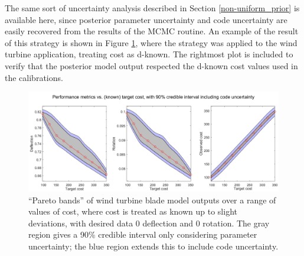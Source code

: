 \documentclass{article}
\begin{document}
The same sort of uncertainty analysis described in Section \ref{non-uniform_prior} is available here, since posterior parameter uncertainty and code uncertainty are easily recovered from the results of the MCMC routine. An example of the result of this strategy is shown in Figure \ref{fig:known_cost}, where the strategy was applied to the wind turbine application, treating cost as d-known. The rightmost plot is included to verify that the posterior model output respected the d-known cost values used in the calibrations.

\begin{figure}
\centering
\includegraphics[width=.9\linewidth]{FIG_costs_code_uncert}
\captionsetup{width=.9\linewidth}
\caption{``Pareto bands'' of wind turbine blade model outputs over a range of values of cost, where cost is treated as known up to slight deviations, with desired data 0 deflection and 0 rotation. The gray region gives a 90\% credible interval only considering parameter uncertainty; the blue region extends this to include code uncertainty.}
\label{fig:known_cost}
\end{figure}



\end{document}
